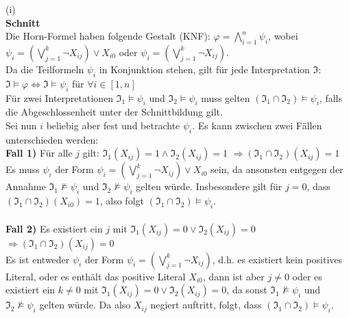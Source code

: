 \documentclass[11pt, a4paper]{article}
\begin{document}
\begin{adjustwidth}{20pt}{20pt}
(i)\\
\textbf{Schnitt}\\
Die Horn-Formel haben folgende Gestalt (KNF): $\varphi = \bigwedge \limits_{i=1}^n \psi_i$, wobei $\psi_i= (\bigvee \limits_{j=1}^k\neg X_{ij}) \vee X_{i0}$ oder $\psi_i= (\bigvee \limits_{j=1}^k\neg X_{ij})$.\\

\noindent Da die Teilformeln $\psi_i$ in Konjunktion stehen, gilt für jede Interpretation $\mathfrak{I}$:\\

$\mathfrak{I} \models \varphi \Leftrightarrow \mathfrak{I} \models \psi_i$ für $\forall i \in [1,n]$\\

\noindent Für zwei Interpretationen $\mathfrak{I_1} \models \psi_i$ und $\mathfrak{I_2} \models \psi_i$ muss  gelten $(\mathfrak{I_1} \cap \mathfrak{I_2}) \models \psi_i$, falls die Abgeschlossenheit unter der Schnittbildung gilt.\\

\noindent Sei nun $i$ beliebig aber fest und betrachte $\psi_i$. Es kann zwischen zwei Fällen unterschieden werden:\\
\textbf{Fall 1)} Für alle $j$ gilt: $\mathfrak{I_1}(X_{ij})=1 \wedge \mathfrak{I_2}(X_{ij})=1$  \hspace*{15 pt} $\Rightarrow (\mathfrak{I_1} \cap \mathfrak{I_2})(X_{ij})=1$\\
Es muss $\psi_i$ der Form $\psi_i= (\bigvee \limits_{j=1}^k\neg X_{ij}) \vee X_{i0}$ sein, da ansonsten entgegen der Annahme $\mathfrak{I_1} \not\models \psi_i$ und 
$\mathfrak{I_2} \not\models \psi_i$ gelten würde. Insbesondere gilt für $j=0$, dass $(\mathfrak{I_1} \cap \mathfrak{I_2})(X_{i0})=1$, also folgt $(\mathfrak{I_1} \cap \mathfrak{I_2}) \models \psi_i$.  \\ \ \\
\textbf{Fall 2)} Es existiert ein $j$ mit $\mathfrak{I_1}(X_{ij})=0 \vee \mathfrak{I_2}(X_{ij})=0$ \hspace*{15 pt} $\Rightarrow (\mathfrak{I_1} \cap \mathfrak{I_2})(X_{ij})=0$\\
Es ist entweder $\psi_i$ der Form $\psi_i= (\bigvee \limits_{j=1}^k\neg X_{ij})$, d.h. es existiert kein positives Literal, oder es enthält das positive Literal $X_{i0}$, dann ist aber
$j\neq 0$ oder es existiert ein $k\neq 0$ mit $\mathfrak{I_1}(X_{ij})=0 \vee \mathfrak{I_2}(X_{ij})=0$, da sonst $\mathfrak{I_1} \not\models \psi_i$ und 
$\mathfrak{I_2} \not\models \psi_i$ gelten würde. Da also $X_{ij}$ negiert auftritt, folgt, dass $(\mathfrak{I_1} \cap \mathfrak{I_2}) \models \psi_i$.\\


\end{adjustwidth}
\end{document}
